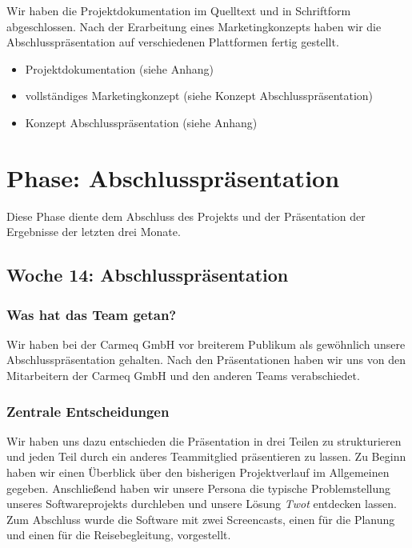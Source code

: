 \documentclass[12pt,a4paper]{article}
\begin{document}
Wir haben die Projektdokumentation im Quelltext und in Schriftform abgeschlossen. Nach der Erarbeitung eines Marketingkonzepts haben wir die Abschlusspr\"asentation auf verschiedenen Plattformen fertig gestellt.

\begin{itemize}
\item Projektdokumentation (siehe Anhang)
\item vollst\"andiges Marketingkonzept (siehe Konzept Abschlusspr\"asentation)
\item Konzept Abschlusspr\"asentation (siehe Anhang)
\end{itemize}


\section{Phase: Abschlusspr\"asentation}

Diese Phase diente dem Abschluss des Projekts und der Pr\"asentation der Ergebnisse der letzten drei Monate.

\subsection{Woche 14: Abschlusspr\"asentation}

\subsubsection{Was hat das Team getan?}

Wir haben bei der Carmeq GmbH vor breiterem Publikum als gew\"ohnlich unsere Abschlusspr\"asentation gehalten. Nach den Pr\"asentationen haben wir uns von den Mitarbeitern der Carmeq GmbH und den anderen Teams verabschiedet.

\subsubsection{Zentrale Entscheidungen}

Wir haben uns dazu entschieden die Pr\"asentation in drei Teilen zu strukturieren und jeden Teil durch ein anderes Teammitglied pr\"asentieren zu lassen. Zu Beginn haben wir einen \"Uberblick \"uber den bisherigen Projektverlauf im Allgemeinen gegeben. Anschlie\ss end haben wir unsere Persona die typische Problemstellung unseres Softwareprojekts durchleben und unsere L\"osung \textit{Twot} entdecken lassen. Zum Abschluss wurde die Software mit zwei Screencasts, einen f\"ur die Planung und einen f\"ur die Reisebegleitung, vorgestellt.
\end{document}
